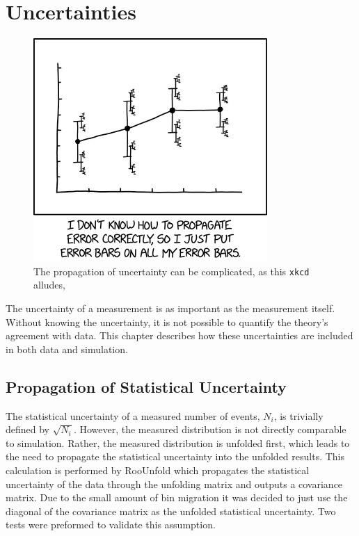 
\chapter{\texorpdfstring{\phistar}{Phistar} Uncertainties}
\label{Uncertainties_chapter}

\begin{figure}[!htbp]
    \centering
    \includegraphics[width=.6\textwidth]{figures/uncertainties/uncertainty.png}
    \caption[]{The propagation of uncertainty can be complicated, as this  {\tt xkcd}\cite{xkcdComic} alludes, }
    \label{fig:xkcd4}
\end{figure}{}
The uncertainty of a measurement is as important as the measurement itself. Without knowing the uncertainty, it is not possible to quantify the theory's agreement with data. This chapter describes how these uncertainties are included in both data and simulation.

\section{Propagation of Statistical Uncertainty}
The statistical uncertainty of a measured number of events, $N_{i}$, is trivially defined by $\sqrt{N_{i}}$. However, the measured \phistar distribution is not directly comparable to simulation. Rather, the measured \phistar distribution is unfolded first, which leads to the need to propagate the statistical uncertainty into the unfolded results. This calculation is performed by RooUnfold which propagates the statistical uncertainty of the data through the unfolding matrix and outputs a covariance matrix. Due to the small amount of bin migration it was decided to just use the diagonal of the covariance matrix as the unfolded statistical uncertainty. Two tests were preformed to validate this assumption. 
